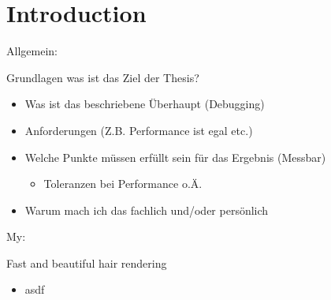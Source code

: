 
\chapter{Introduction}\label{cha:Introduction}


Allgemein:
\par Grundlagen was ist das Ziel der Thesis?
\begin{itemize}
	\item Was ist das beschriebene Überhaupt (Debugging)
	\item Anforderungen (Z.B. Performance ist egal etc.)
	\item Welche Punkte müssen erfüllt sein für das Ergebnis (Messbar)
	\begin{itemize}
		\item Toleranzen bei Performance o.Ä.
	\end{itemize}
	\item Warum mach ich das fachlich und/oder persönlich 
\end{itemize}


My:
\par Fast and beautiful hair rendering
\begin{itemize}
	\item asdf
\end{itemize}
